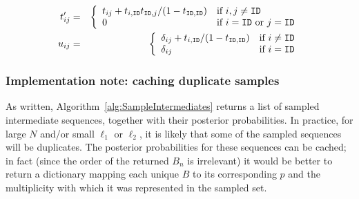 \documentclass{article}
\newcommand\seclabel[1]{\label{sec:#1}}
\newcommand\algoref[1]{Algorithm~\ref{alg:#1}}
\begin{document}
\begin{eqnarray*}
  t'_{ij} & = & \left\{ \begin{array}{ll}
    t_{ij} + t_{i,{\tt ID}} t_{{\tt ID},j} / (1 - t_{{\tt ID},{\tt ID}}) & \mbox{if $i,j \neq {\tt ID}$} \\
    0 & \mbox{if $i={\tt ID}$ or $j={\tt ID}$}
    \end{array}
    \right. \\
  u_{ij} & = & \left\{ \begin{array}{ll}
    \delta_{ij} + t_{i,{\tt ID}} / (1 - t_{{\tt ID},{\tt ID}}) & \mbox{if $i \neq {\tt ID}$} \\
    \delta_{ij} & \mbox{if $i={\tt ID}$}
    \end{array}
    \right. \\
\end{eqnarray*}

\subsubsection{Implementation note: caching duplicate samples}
\seclabel{DuplicateSamples}

As written, \algoref{SampleIntermediates} returns a list of sampled intermediate sequences,
together with their posterior probabilities.
In practice, for large $N$ and/or small $\ell_1$ or $\ell_2$, it is likely
that some of the sampled sequences will be duplicates.
The posterior probabilities for these sequences can be cached;
in fact (since the order of the returned $B_n$ is irrelevant)
it would be better to return a dictionary mapping each unique $B$ to its corresponding $p$ and the multiplicity
with which it was represented in the sampled set.
\end{document}
